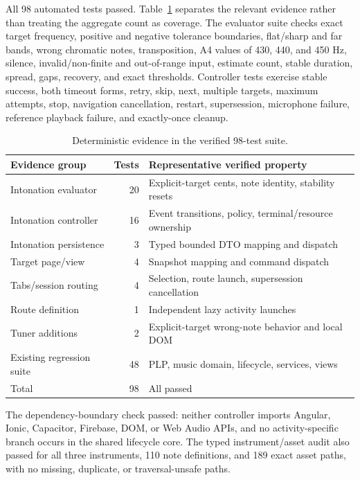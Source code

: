 \documentclass[runningheads]{llncs}
\begin{document}
All 98 automated tests passed. Table~\ref{tab:tests} separates the relevant
evidence rather than treating the aggregate count as coverage. The evaluator
suite checks exact target frequency, positive and negative tolerance
boundaries, flat/sharp and far bands, wrong chromatic notes, transposition,
A4 values of 430, 440, and 450 Hz, silence, invalid/non-finite and
out-of-range input, estimate count, stable duration, spread, gaps, recovery,
and exact thresholds. Controller tests exercise stable success, both timeout
forms, retry, skip, next, multiple targets, maximum attempts, stop,
navigation cancellation, restart, supersession, microphone failure, reference
playback failure, and exactly-once cleanup.

\begin{table}[t]
\caption{Deterministic evidence in the verified 98-test suite.}
\label{tab:tests}
\centering
\small
\begin{tabularx}{\textwidth}{@{}l r X@{}}
\toprule
Evidence group & Tests & Representative verified property\\
\midrule
Intonation evaluator & 20 & Explicit-target cents, note identity, stability resets\\
Intonation controller & 16 & Event transitions, policy, terminal/resource ownership\\
Intonation persistence & 3 & Typed bounded DTO mapping and dispatch\\
Target page/view & 4 & Snapshot mapping and command dispatch\\
Tabs/session routing & 4 & Selection, route launch, supersession cancellation\\
Route definition & 1 & Independent lazy activity launches\\
Tuner additions & 2 & Explicit-target wrong-note behavior and local DOM\\
Existing regression suite & 48 & PLP, music domain, lifecycle, services, views\\
\midrule
Total & 98 & All passed\\
\bottomrule
\end{tabularx}
\end{table}

The dependency-boundary check passed: neither controller imports Angular,
Ionic, Capacitor, Firebase, DOM, or Web Audio APIs, and no activity-specific
branch occurs in the shared lifecycle core. The typed instrument/asset audit
also passed for all three instruments, 110 note definitions, and 189 exact
asset paths, with no missing, duplicate, or traversal-unsafe paths.
\end{document}
